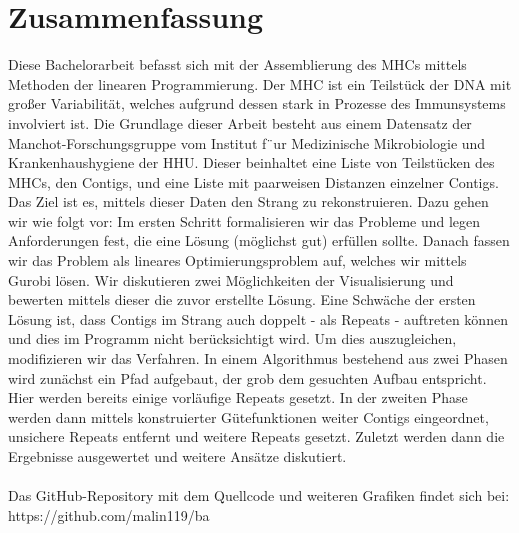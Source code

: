\chapter*{Zusammenfassung}\raggedbottom 


Diese Bachelorarbeit befasst sich mit der Assemblierung des MHCs mittels Methoden der linearen Programmierung.
Der MHC ist ein Teilstück der DNA mit großer Variabilität, welches aufgrund dessen stark in Prozesse des Immunsystems involviert ist. 
Die Grundlage dieser Arbeit besteht aus einem Datensatz der Manchot-Forschungsgruppe vom Institut f¨ur Medizinische Mikrobiologie und Krankenhaushygiene der HHU. Dieser beinhaltet eine Liste von Teilstücken des MHCs, den Contigs, und eine Liste mit paarweisen Distanzen einzelner Contigs. Das Ziel ist es, mittels dieser Daten den Strang zu rekonstruieren.
Dazu gehen wir wie folgt vor: Im ersten Schritt formalisieren wir das Probleme und legen Anforderungen fest, die eine Lösung (möglichst gut) erfüllen sollte. Danach fassen wir das Problem als lineares Optimierungsproblem auf, welches wir mittels Gurobi lösen. Wir diskutieren zwei Möglichkeiten der Visualisierung und bewerten mittels dieser die zuvor erstellte Lösung. 
Eine Schwäche der ersten Lösung ist, dass Contigs im Strang auch doppelt - als Repeats - auftreten können und dies im Programm nicht berücksichtigt wird.
Um dies auszugleichen, modifizieren wir das Verfahren. In einem Algorithmus bestehend aus zwei Phasen wird zunächst ein Pfad aufgebaut, der grob dem gesuchten Aufbau entspricht. Hier werden bereits einige vorläufige Repeats gesetzt. In der zweiten Phase werden dann mittels konstruierter Gütefunktionen weiter Contigs eingeordnet, unsichere Repeats entfernt und weitere Repeats gesetzt.
Zuletzt werden dann die Ergebnisse ausgewertet und weitere Ansätze diskutiert.\\\\


Das GitHub-Repository mit dem Quellcode und weiteren Grafiken findet sich bei:\\
https://github.com/malin119/ba